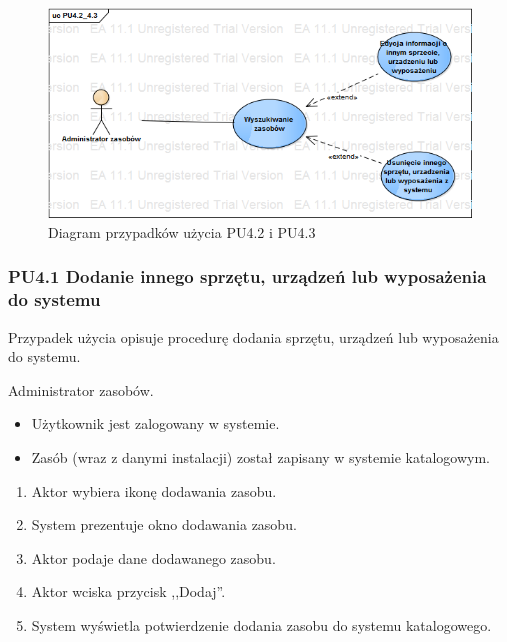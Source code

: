 \begin{figure}[h!]
	\centering
	\includegraphics[scale=0.6]{img/diagrams/useCaseDiagrams/PU4_2_4_3.png}
	\caption{Diagram przypadków użycia PU4.2 i PU4.3 \label{fig:labelUCPU4.2_4.3}}
\end{figure}

\subsubsection{PU4.1 Dodanie innego sprzętu, urządzeń lub wyposażenia do systemu}

Przypadek użycia opisuje procedurę dodania sprzętu, urządzeń lub wyposażenia do systemu.

Administrator zasobów.

\begin{itemize}
\item Użytkownik jest zalogowany w systemie.
\end{itemize}

\begin{itemize}
\item Zasób (wraz z danymi instalacji) został zapisany w systemie katalogowym.
\end{itemize}

\begin{enumerate}
\item \label{pu4.1:1} Aktor wybiera ikonę dodawania zasobu.
\item System prezentuje okno dodawania zasobu.
\item Aktor podaje dane dodawanego zasobu.
\item \label{pu4.1:4} Aktor wciska przycisk ,,Dodaj''.
\item System wyświetla potwierdzenie dodania zasobu do systemu katalogowego.
\end{enumerate}

